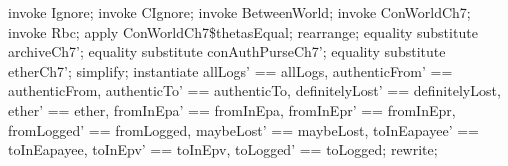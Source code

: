 

\begin{LPScript}\begin{zproof}[tBetwConcCIgnoreCorrect]
    invoke Ignore;
    invoke CIgnore;
    invoke \Xi BetweenWorld;
    invoke \Xi ConWorldCh7;
    invoke Rbc;
    apply ConWorldCh7\$thetasEqual;
    rearrange;
    equality substitute archiveCh7';
    equality substitute conAuthPurseCh7';
    equality substitute etherCh7';
    simplify;
    instantiate allLogs' == allLogs, authenticFrom' == authenticFrom,
        authenticTo' == authenticTo, definitelyLost' == definitelyLost,
        ether' == ether, fromInEpa' == fromInEpa,
        fromInEpr' == fromInEpr, fromLogged' == fromLogged,
        maybeLost' == maybeLost, toInEapayee' == toInEapayee,
        toInEpv' == toInEpv, toLogged' == toLogged;
    rewrite;
\end{zproof}\end{LPScript}

